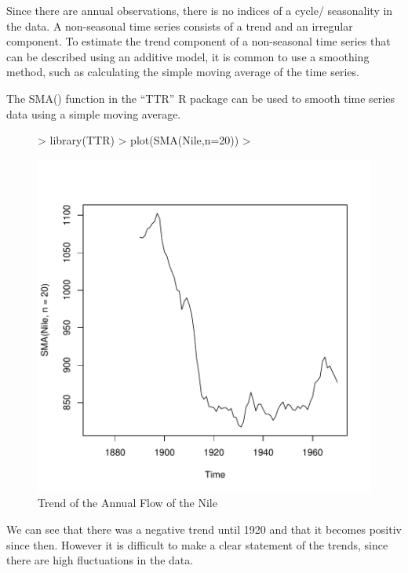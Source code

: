 \documentclass[11pt, a4paper]{article} %
\begin{document}
\noindent Since there are annual observations, there is no indices of a cycle/ seasonality in the data. A non-seasonal time series consists of a trend and an irregular component. 
To estimate the trend component of a non-seasonal time series that can be described using an additive model, it is common to use a smoothing method, such as calculating the simple moving average of the time series.

\noindent The SMA() function in the “TTR” R package can be used to smooth time series data using a simple moving average. 
\begin{figure}
\centering
\begin{Schunk}
\begin{Sinput}
> library(TTR)
> plot(SMA(Nile,n=20))
> 
\end{Sinput}
\end{Schunk}
\includegraphics{alles-036}
\caption{Trend of the Annual Flow of the Nile}
\end{figure}

\noindent We can see that there was a negative trend until 1920 and that it becomes positiv since then. However it is difficult to make a clear statement of the trends, since there are high fluctuations in the data.\\
\end{document}
